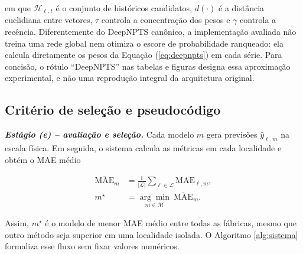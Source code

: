 \documentclass[11pt,a4paper]{article}
\begin{document}
em que $\mathcal H_{\ell,t}$ é o conjunto de históricos candidatos, $d(\cdot)$ é a distância euclidiana entre vetores, $\tau$ controla a concentração dos pesos e $\gamma$ controla a recência. Diferentemente do DeepNPTS canônico, a implementação avaliada não treina uma rede global nem otimiza o escore de probabilidade ranqueado: ela calcula diretamente os pesos da Equação (\ref{eq:deepnpts}) em cada série. Para concisão, o rótulo ``DeepNPTS'' nas tabelas e figuras designa essa aproximação experimental, e não uma reprodução integral da arquitetura original.

\subsection{Critério de seleção e pseudocódigo}

\noindent\textbf{\textit{Estágio (e) -- avaliação e seleção.}} Cada modelo $m$ gera previsões $\hat y_{\ell,m}$ na escala física. Em seguida, o sistema calcula as métricas em cada localidade e obtém o MAE médio

\begin{equation}
\begin{aligned}
\overline{\mathrm{MAE}}_{m}&=\frac{1}{|\mathcal{L}|}\sum_{\ell\in\mathcal{L}}\mathrm{MAE}_{\ell,m},\\
m^{\star}&=\underset{m\in\mathcal{M}}{\arg\min}\ \overline{\mathrm{MAE}}_{m}.
\end{aligned}
\label{eq:selecao}
\end{equation}

Assim, $m^{\star}$ é o modelo de menor MAE médio entre todas as fábricas, mesmo que outro método seja superior em uma localidade isolada. O Algoritmo \ref{alg:sistema} formaliza esse fluxo sem fixar valores numéricos.
\end{document}
